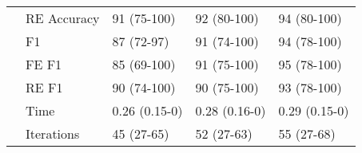 \begin{tabular}{lllll}
    & RE Accuracy &          91 (75-100) &          92 (80-100) &          94 (80-100) \\
    & F1 &           87 (72-97) &          91 (74-100) &          94 (78-100) \\
    & FE F1 &          85 (69-100) &          91 (75-100) &          95 (78-100) \\
    & RE F1 &          90 (74-100) &          90 (75-100) &          93 (78-100) \\
    & Time &        0.26 (0.15-0) &        0.28 (0.16-0) &        0.29 (0.15-0) \\
    & Iterations &           45 (27-65) &           52 (27-63) &           55 (27-68) \\
\bottomrule
\end{tabular}
